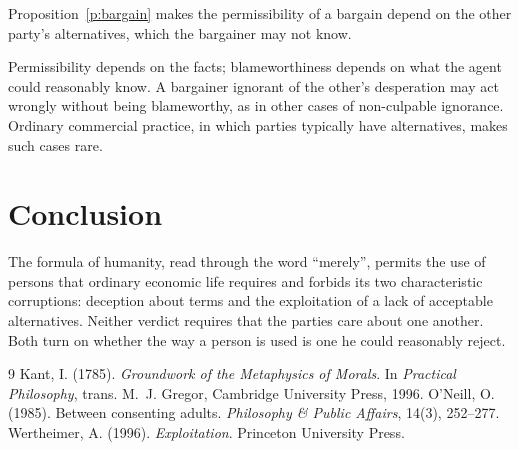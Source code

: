 \documentclass{situationist-preprint}
\begin{document}
\begin{objection}
Proposition~\ref{p:bargain} makes the permissibility of a bargain depend on the other party's alternatives, which the bargainer may not know.
\end{objection}

\begin{reply}
Permissibility depends on the facts; blameworthiness depends on what the agent could reasonably know. A bargainer ignorant of the other's desperation may act wrongly without being blameworthy, as in other cases of non-culpable ignorance. Ordinary commercial practice, in which parties typically have alternatives, makes such cases rare.
\end{reply}

\section{Conclusion}

The formula of humanity, read through the word \enquote{merely}, permits the use of persons that ordinary economic life requires and forbids its two characteristic corruptions: deception about terms and the exploitation of a lack of acceptable alternatives. Neither verdict requires that the parties care about one another. Both turn on whether the way a person is used is one he could reasonably reject.

\begin{thebibliography}{9}\small
{} Kant, I. (1785). \emph{Groundwork of the Metaphysics of Morals}. In \emph{Practical Philosophy}, trans. M.~J. Gregor, Cambridge University Press, 1996.
 O'Neill, O. (1985). Between consenting adults. \emph{Philosophy \& Public Affairs}, 14(3), 252--277.
 Wertheimer, A. (1996). \emph{Exploitation}. Princeton University Press.
\end{thebibliography}
\end{document}
